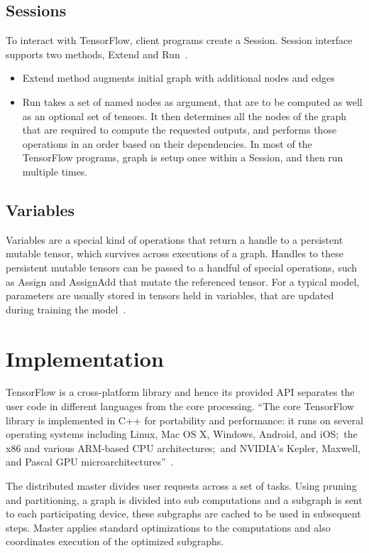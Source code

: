 \subsection{Sessions}

To interact with TensorFlow, client programs create a Session. Session
interface supports two methods, Extend and Run~\cite{hid-sp18-510-notes}. 
\begin{itemize} 
	\item Extend method augments initial graph with additional nodes and edges
	\item Run takes a set of named nodes as argument, that are to be
computed as well as an optional set of tensors. It then determines all
the nodes of the graph that are required to compute the requested
outputs, and performs those operations in an order based on their
dependencies. In most of the TensorFlow programs, graph is setup once
within a Session, and then run multiple times. 
\end{itemize}

\subsection{Variables} 
Variables are a special kind of operations
that return a handle to a persistent mutable tensor, which survives
across executions of a graph. Handles to these persistent mutable
tensors can be passed to a handful of special operations, such as
Assign and AssignAdd that mutate the referenced tensor. For a typical
model, parameters are usually stored in tensors held in variables,
that are updated during training the model~\cite{hid-sp18-510-notes}.

\section{Implementation}
TensorFlow is a cross-platform library and hence its provided API
separates the user code in different languages from the core
processing. ``The core TensorFlow library is implemented in C++ for
portability and performance: it runs on several operating systems
including Linux, Mac OS X, Windows, Android, and iOS;~the x86 and
various ARM-based CPU architectures;~and NVIDIA's Kepler, Maxwell, and
Pascal GPU microarchitectures''~\cite{hid-sp18-510-tensorflow-whitepaper-2}. 

The distributed master divides user requests across a set of tasks. Using
pruning and partitioning, a graph is divided into sub computations and
a subgraph is sent to each participating device, these subgraphs are
cached to be used in subsequent steps. Master applies standard
optimizations to the computations and also coordinates execution of
the optimized subgraphs. 

